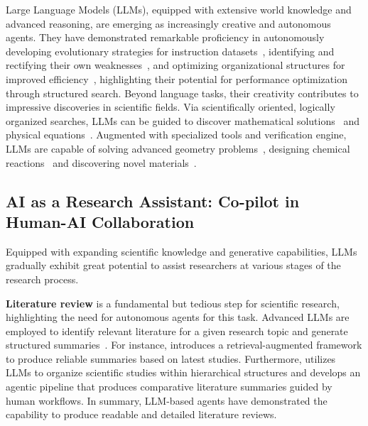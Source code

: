 \documentclass{article} %
\newcommand{\AIGS}{AIGS\xspace}
\begin{document}
Large Language Models (LLMs), equipped with extensive world knowledge and advanced reasoning, are emerging as increasingly creative and autonomous agents. They have demonstrated remarkable proficiency in autonomously developing evolutionary strategies for instruction datasets~\citep{zeng2024automaticevol}, identifying and rectifying their own weaknesses~\citep{cheng2024autodetect, mcaleese2024llmbugs}, and optimizing organizational structures for improved efficiency~\citep{zhang2024aflow, hu2024automatedagents}, highlighting their potential for performance optimization through structured search. Beyond language tasks, their creativity contributes to impressive discoveries in scientific fields. Via scientifically oriented, logically organized searches, LLMs can be guided to discover mathematical solutions~\citep{romera2024mathematical} and physical equations~\citep{ma2024llmphysics, shojaee2024llmsr}. Augmented with specialized tools and verification engine, LLMs are capable of solving advanced geometry problems~\citep{trinh2024solving}, designing chemical reactions~\citep{chen2024chemistxlargelanguagemodelempowered} and discovering novel materials~\citep{bran2023chemcrow, ghafarollahi2024protagents}.

\subsection{AI as a Research Assistant: Co-pilot in Human-AI Collaboration}

Equipped with expanding scientific knowledge and generative capabilities, LLMs gradually exhibit great potential to assist researchers at various stages of the research process. 

\textbf{Literature review} is a fundamental but tedious step for scientific research, highlighting the need for autonomous agents for this task. Advanced LLMs are employed to identify relevant literature for a given research topic and generate structured summaries~\citep{haman2024using, huang2023role}. For instance, \citet{agarwal2024litllm} introduces a retrieval-augmented framework to produce reliable summaries based on latest studies. Furthermore, \citet{hsu2024chime} utilizes LLMs to organize scientific studies within hierarchical structures and \citet{li2024chatcite} develops an agentic pipeline that produces comparative literature summaries guided by human workflows. In summary, LLM-based agents have demonstrated the capability to produce readable and detailed literature reviews. 
\end{document}
